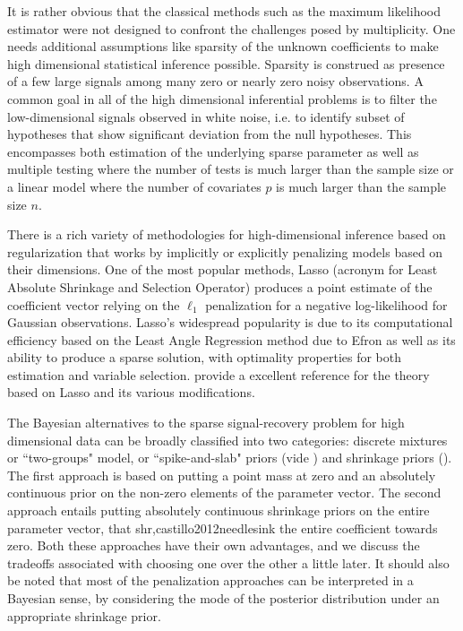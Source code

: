 \documentclass[11pt]{article}
\numberwithin{equation}{section}
\begin{document}
It is rather obvious that the classical methods such as the maximum likelihood estimator were not designed to confront the challenges posed by multiplicity. One needs additional assumptions like sparsity of the unknown coefficients to make high dimensional statistical inference possible. Sparsity is construed as presence of a few large signals among many zero or nearly zero noisy observations. A common goal in all of the high dimensional inferential problems is to filter the low-dimensional signals observed in white noise, i.e. to identify subset of hypotheses that show significant deviation from the null hypotheses. This encompasses both estimation of the underlying sparse parameter as well as multiple testing where the number of tests is much larger than the sample size or a linear model where the number of covariates $p$ is much larger than the sample size $n$. 

There is a rich variety of methodologies for high-dimensional inference based on regularization that works by implicitly or explicitly penalizing models based on their dimensions. One of the most popular methods, Lasso (acronym for Least Absolute Shrinkage and Selection Operator) produces a point estimate of the coefficient vector relying on the $\ell_1$ penalization for a negative log-likelihood for Gaussian observations. Lasso's widespread popularity is due to its computational efficiency based on the Least Angle Regression method due to Efron as well as its ability to produce a sparse solution, with optimality properties for both estimation and variable selection. \cite{buhlmann2011statistics} provide a excellent reference for the theory based on Lasso and its various modifications. \par 

The Bayesian alternatives to the sparse signal-recovery problem for high dimensional data can be broadly classified into two categories: discrete mixtures or ``two-groups" model, or ``spike-and-slab" priors (vide \cite{johnstone2004needles,efron2010large,efron2008microarrays,bogdan2011asymptotic}) and shrinkage priors (\cite{carvalho2009handling,griffin2010inference,polson2010shrink,carvalho2010horseshoe,armagan2011generalized,castillo2012needles,armagan2013generalized}). The first approach is based on putting a point mass at zero and an absolutely continuous prior on the non-zero elements of the parameter vector. The second approach entails putting absolutely continuous shrinkage priors on the entire parameter vector, that shr,castillo2012needlesink the entire coefficient towards zero. Both these approaches have their own advantages, and we discuss the tradeoffs associated with choosing one over the other a little later.  It should also be noted that most of the penalization approaches can be interpreted in a Bayesian sense, by considering the mode of the posterior distribution under an appropriate shrinkage prior. 
\end{document}
